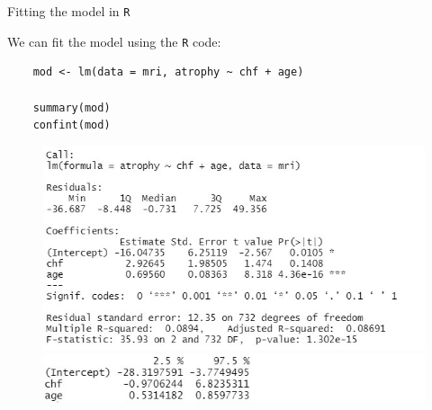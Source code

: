 \documentclass[10pt,t]{beamer}
\begin{document}
\begin{frame}[fragile]{Fitting the model in \texttt{R}}
	
	\vspace{-5 mm}
	
	We can fit the model using the \texttt{R} code:
	
	\begin{lstlisting}
	mod <- lm(data = mri, atrophy ~ chf + age)
	
	summary(mod)
	confint(mod)
	\end{lstlisting}
	\begin{figure}
		\includegraphics[scale = 0.45]{figures/mri_multiple_eg1}
		
		\includegraphics[scale = 0.47]{figures/mri_multiple_cis}
	\end{figure}
	
\end{frame}
\end{document}
